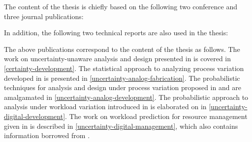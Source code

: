 The content of the thesis is chiefly based on the following two conference and
three journal publications:

\printbibliography[heading=none,keyword=own]

In addition, the following two technical reports are also used in the thesis:

\printbibliography[heading=none,keyword=own-unpublished]

The above publications correspond to the content of the thesis as follows. The
work on uncertainty-unaware analysis and design presented in \cite{ukhov2012} is
covered in \cref{certainty-development}. The statistical approach to analyzing
process variation developed in \cite{ukhov2014a} is presented in
\cref{uncertainty-analog-fabrication}. The probabilistic techniques for analysis
and design under process variation proposed in \cite{ukhov2014b} and
\cite{ukhov2015} are amalgamated in \cref{uncertainty-analog-development}. The
probabilistic approach to analysis under workload variation introduced in
\cite{ukhov2017a} is elaborated on in \cref{uncertainty-digital-development}.
The work on workload prediction for resource management given in
\cite{ukhov2017b} is described in \cref{uncertainty-digital-management}, which
also contains information borrowed from \cite{ukhov2017c}.
